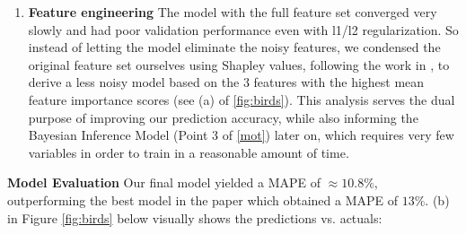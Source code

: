 \documentclass{article}
\begin{document}
\begin{enumerate}[label=(\alph*), leftmargin=.35in]
\item \textbf{Feature engineering}
The model with the full feature set converged very slowly and had poor validation performance even with l1/l2 regularization.  So instead of letting the model eliminate the noisy features, we condensed the original feature set ourselves using Shapley values, following the work in \cite{shap}, to derive a less noisy model based on the 3 features with the highest mean feature importance scores (see (a) of \ref{fig:birds}).  This analysis serves the dual purpose of improving our prediction accuracy, while also informing the Bayesian Inference Model (Point 3 of \ref{mot}) later on, which requires very few variables in order to train in a reasonable amount of time.


\end{enumerate}

\textbf{Model Evaluation} Our final model yielded a MAPE of $\approx 10.8 \%$, outperforming the best model in the paper which obtained a MAPE of $13 \%$. (b) in Figure \ref{fig:birds} below visually shows the predictions vs. actuals:
\end{document}
